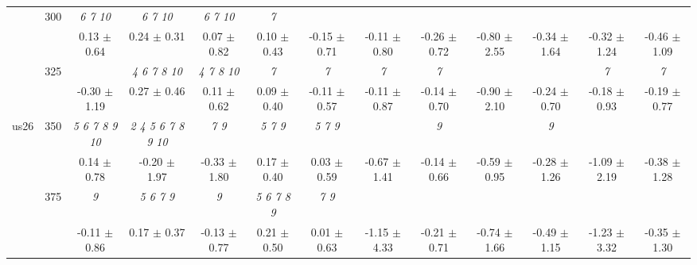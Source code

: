 \begin{table}[h]
{\begin{tabular}{
        ccccccccccccc}
 & \multirow{2}{*}{300}& \textit{  6  7 10 }& \textit{  6  7 10 }& \textit{  6  7 10 }& \textit{ 7 }& & & & & & &  \\ 
 & & 0.13 $\pm$ 0.64& 0.24 $\pm$ 0.31& 0.07 $\pm$ 0.82& 0.10 $\pm$ 0.43& -0.15 $\pm$ 0.71& -0.11 $\pm$ 0.80& -0.26 $\pm$ 0.72& -0.80 $\pm$ 2.55& -0.34 $\pm$ 1.64& -0.32 $\pm$ 1.24& -0.46 $\pm$ 1.09 \\ 
 & \multirow{2}{*}{325}& \cellcolor[HTML]{EFEFEF} & \cellcolor[HTML]{EFEFEF} \textit{  4  6  7  8 10 }& \cellcolor[HTML]{EFEFEF} \textit{  4  7  8 10 }& \cellcolor[HTML]{EFEFEF} \textit{ 7 }& \cellcolor[HTML]{EFEFEF} \textit{ 7 }& \cellcolor[HTML]{EFEFEF} \textit{ 7 }& \cellcolor[HTML]{EFEFEF} \textit{ 7 }& \cellcolor[HTML]{EFEFEF} & \cellcolor[HTML]{EFEFEF} & \cellcolor[HTML]{EFEFEF} \textit{ 7 }& \cellcolor[HTML]{EFEFEF} \textit{ 7 } \\ 
 & & \cellcolor[HTML]{EFEFEF} -0.30 $\pm$ 1.19& \cellcolor[HTML]{EFEFEF} 0.27 $\pm$ 0.46& \cellcolor[HTML]{EFEFEF} 0.11 $\pm$ 0.62& \cellcolor[HTML]{EFEFEF} 0.09 $\pm$ 0.40& \cellcolor[HTML]{EFEFEF} -0.11 $\pm$ 0.57& \cellcolor[HTML]{EFEFEF} -0.11 $\pm$ 0.87& \cellcolor[HTML]{EFEFEF} -0.14 $\pm$ 0.70& \cellcolor[HTML]{EFEFEF} -0.90 $\pm$ 2.10& \cellcolor[HTML]{EFEFEF} -0.24 $\pm$ 0.70& \cellcolor[HTML]{EFEFEF} -0.18 $\pm$ 0.93& \cellcolor[HTML]{EFEFEF} -0.19 $\pm$ 0.77 \\ 
 \multirow{4}{*}{us26} & \multirow{2}{*}{350}& \textit{  5  6  7  8  9 10 }& \textit{  2  4  5  6  7  8  9 10 }& \textit{ 7 9 }& \textit{ 5 7 9 }& \textit{ 5 7 9 }& & \textit{ 9 }& & \textit{ 9 }& &  \\ 
 & & 0.14 $\pm$ 0.78& -0.20 $\pm$ 1.97& -0.33 $\pm$ 1.80& 0.17 $\pm$ 0.40& 0.03 $\pm$ 0.59& -0.67 $\pm$ 1.41& -0.14 $\pm$ 0.66& -0.59 $\pm$ 0.95& -0.28 $\pm$ 1.26& -1.09 $\pm$ 2.19& -0.38 $\pm$ 1.28 \\ 
 & \multirow{2}{*}{375}& \cellcolor[HTML]{EFEFEF} \textit{ 9 }& \cellcolor[HTML]{EFEFEF} \textit{ 5 6 7 9 }& \cellcolor[HTML]{EFEFEF} \textit{ 9 }& \cellcolor[HTML]{EFEFEF} \textit{ 5 6 7 8 9 }& \cellcolor[HTML]{EFEFEF} \textit{ 7 9 }& \cellcolor[HTML]{EFEFEF} & \cellcolor[HTML]{EFEFEF} & \cellcolor[HTML]{EFEFEF} & \cellcolor[HTML]{EFEFEF} & \cellcolor[HTML]{EFEFEF} & \cellcolor[HTML]{EFEFEF}  \\ 
 & & \cellcolor[HTML]{EFEFEF} -0.11 $\pm$ 0.86& \cellcolor[HTML]{EFEFEF} 0.17 $\pm$ 0.37& \cellcolor[HTML]{EFEFEF} -0.13 $\pm$ 0.77& \cellcolor[HTML]{EFEFEF} 0.21 $\pm$ 0.50& \cellcolor[HTML]{EFEFEF} 0.01 $\pm$ 0.63& \cellcolor[HTML]{EFEFEF} -1.15 $\pm$ 4.33& \cellcolor[HTML]{EFEFEF} -0.21 $\pm$ 0.71& \cellcolor[HTML]{EFEFEF} -0.74 $\pm$ 1.66& \cellcolor[HTML]{EFEFEF} -0.49 $\pm$ 1.15& \cellcolor[HTML]{EFEFEF} -1.23 $\pm$ 3.32& \cellcolor[HTML]{EFEFEF} -0.35 $\pm$ 1.30 \\ 

\end{tabular}}
\end{table}
